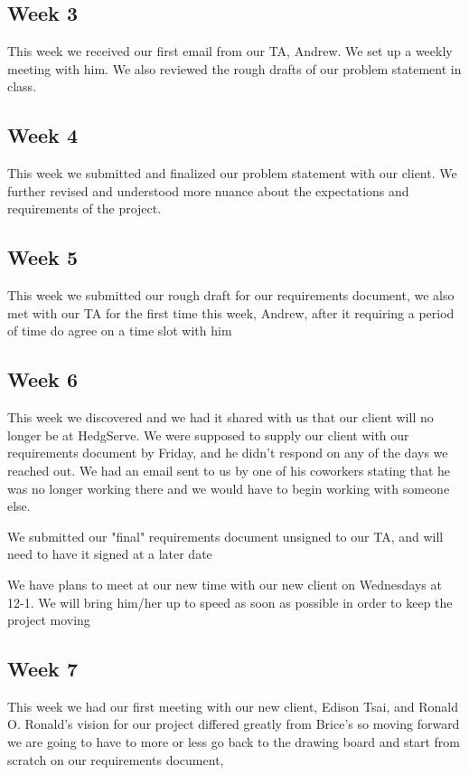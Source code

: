 \documentclass[letterpaper,10pt,titlepage,journal,compsoc,draftclsnofoot,onecolumn]{IEEEtran}
\begin{document}
    \subsection{Week 3}
    This week we received our first email from our TA, Andrew. We set up a weekly meeting with him. We also reviewed the rough drafts of our problem statement in class.
    
    
    \subsection{Week 4}
    This week we submitted and finalized our problem statement with our client. We further revised and understood more nuance about the expectations and requirements of the project.

    
    \subsection{Week 5}
       This week we submitted our rough draft for our requirements document, we also met with our TA for the first time this week, Andrew, after it requiring a period of time do agree on a time slot with him 
    
    \subsection{Week 6}
        This week we discovered and we had it shared with us that our client will no longer be at HedgServe. We were supposed to supply our client with our requirements document by Friday, and he didn't respond on any of the days we reached out. We had an email sent to us by one of his coworkers stating that he was no longer working there and we would have to begin working with someone else. 
 
        We submitted our "final" requirements document unsigned to our TA, and will need to have it signed at a later date 
        
        We have plans to meet at our new time with our new client on Wednesdays at 12-1. We will bring him/her up to speed as soon as possible in order to keep the project moving 
            
    
    \subsection{Week 7}
        This week we had our first meeting with our new client, Edison Tsai, and Ronald O. Ronald's vision for our project differed greatly from Brice's so moving forward we are going to have to more or less go back to the drawing board and start from scratch on our requirements document, 
 
\end{document}

